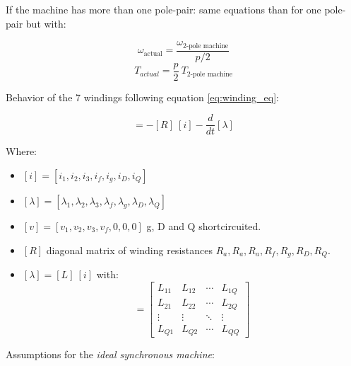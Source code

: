 If the machine has more than one pole-pair: same equations than for one pole-pair but with:

\begin{equation}
    \omega_{\text{actual}} = \frac{\omega_{\text{2-pole machine}}}{p/2}
\end{equation}
\begin{equation}
    T_{actual} = \frac{p}{2}~T_{\text{2-pole machine}}
\end{equation}

Behavior of the 7 windings following equation \ref{eq:winding_eq}:

\begin{equation}
    [v] = -[R]~[i]-\frac{d}{dt}[\lambda]
    \label{eq:v_windings}
\end{equation}

Where:
\begin{itemize}
    \item $[i] = [i_1,i_2, i_3, i_f, i_g, i_D, i_Q]$
    \item $[\lambda] = [\lambda_1, \lambda_2, \lambda_3, \lambda_f, \lambda_g, \lambda_D, \lambda_Q]$
    \item $[v] = [v_1, v_2, v_3, v_f, 0, 0,0]$ g, D and Q shortcircuited.
    \item $[R]$ diagonal matrix of winding resistances $R_a, R_a, R_a, R_f, R_g, R_D, R_Q$.
    \item $[\lambda] = [L]~[i]$ with:
    \begin{equation}
    [L] =
    \begin{bmatrix}
    L_{11} & L_{12} & \cdots & L_{1Q} \\
    L_{21} & L_{22} & \cdots & L_{2Q} \\
    \vdots & \vdots & \ddots & \vdots \\
    L_{Q1} & L_{Q2} & \cdots & L_{QQ}
    \end{bmatrix}
    \end{equation}
    
\end{itemize}

Assumptions for the  \textit{ideal synchronous machine}:

